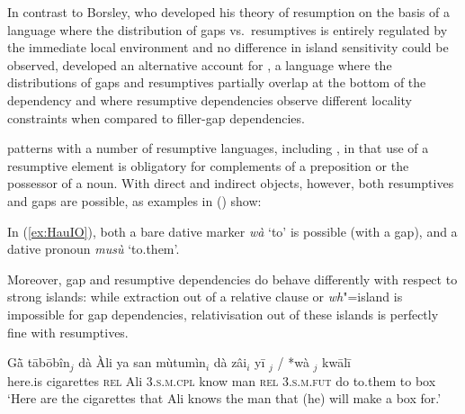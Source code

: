 \documentclass[output=paper
,notxmath 
 	        ,biblatex
                ,babelshorthands
                ,newtxmath
                ,draftmode
                ,colorlinks, citecolor=brown
]{langscibook}
\begin{document}
In contrast to Borsley, who developed his theory of resumption on the
basis of a language where the distribution of gaps vs.\ resumptives is
entirely regulated by the immediate local environment and no
difference in island sensitivity could be observed,
\citet{Crysmann:12} developed an alternative account for , a
language where the distributions of gaps and resumptives partially
overlap at the bottom of the dependency and where resumptive
dependencies observe different locality constraints when compared to
filler-gap dependencies.

 patterns with a number of resumptive languages, including , in that use of a
resumptive element is obligatory for
complements of a preposition or the possessor of a noun. With direct and indirect objects, however,
both resumptives and gaps are possible, as  examples in () show: 

\eal
\label{ex:HauIO}
\zl


\noindent
In (\ref{ex:HauIO}), both a bare dative marker \textit{wà} `to' is
possible (with a gap), and a dative pronoun \textit{musù} `to.them'.

Moreover, gap and resumptive dependencies do behave differently with
respect to strong islands: while extraction out of a relative clause
or \emph{wh}"=island is impossible for gap dependencies,
relativisation out of these islands is perfectly fine with
resumptives.

\ea
\label{ex:HauResLongIO}
\gll Gā̀      tābōbîn$_j$ dà          Àli ya                 san  mùtumìn$_i$ dà           zâi$_i$            yī $_j$ /  *{wà \trace{}$_j$}   kwālī\footnotemark\\
     here.is cigarettes \textsc{rel} Ali \textsc{3.s.m.cpl} know man         \textsc{rel} \textsc{3.s.m.fut} do to.them           {} \hphantom{*}to     box\\
    \glt `Here are the cigarettes that Ali knows the man that (he) will make a box for.'
\z
\end{document}
